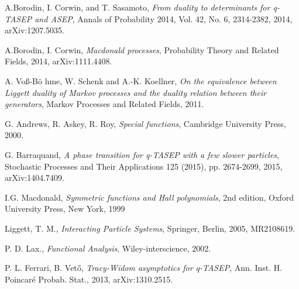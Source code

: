 \begin{singlespace}



\begin{thebibliography}{9}

  A.Borodin, I. Corwin, and T. Sasamoto,
  \emph{From duality to determinants for q-TASEP and ASEP},
  Annals of Probability 2014,
  Vol. 42, No. 6, 2314-2382,
  2014,
  arXiv:1207.5035.

  A.Borodin, I. Corwin,
  \emph{Macdonald processes},
  Probability Theory and Related Fields,
  2014,
  arXiv:1111.4408.

  A. Vo\ss -B\"o hme, W. Schenk and A.-K. Koellner,
  \emph{On the equivalence between Liggett duality of Markov processes and the duality relation between their generators},
  Markov Processes and Related Fields,
  2011.

  G. Andrews, R. Askey, R. Roy,
  \emph{Special functions},
  Cambridge University Press,
  2000.

  G. Barraquand,
  \emph{A phase transition for q-TASEP with a few slower particles},
  Stochastic Processes and Their Applications 125 (2015),
  pp. 2674-2699,
  2015,
  arXiv:1404.7409.

  I.G. Macdonald,
  \emph{Symmetric functions and Hall polynomials},
  2nd edition, 
  Oxford University Press,
  New York,
  1999

  Liggett, T. M.,
  \emph{Interacting Particle Systems},
  Springer,
  Berlin,
  2005,
  MR2108619.

  P. D. Lax.,
  \emph{Functional Analysis},
  Wiley-interscience,
  2002.

  P. L. Ferrari, B. Vet\H o,
  \emph{Tracy-Widom asymptotics for q-TASEP},
  Ann. Inst. H. Poincar\' e Probab. Stat.,
  2013,
  arXiv:1310.2515.

\end{thebibliography}

\end{singlespace}
